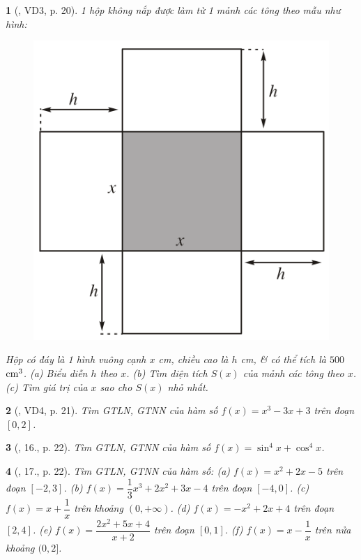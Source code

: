 \documentclass{article}
\newtheorem{baitoan}{}
\begin{document}
\begin{baitoan}[\cite{SGK_Toan_12_giai_tich_nang_cao}, VD3, p. 20]
	1 hộp không nắp được làm từ 1 mảnh các tông theo mẫu như hình:
	\begin{figure}[H]
		\centering
		\includegraphics[scale=.25]{hop_khong_nap}
	\end{figure}
	\noindent Hộp có đáy là 1 hình vuông cạnh $x$ {\rm cm}, chiều cao là $h$ {\rm cm}, \& có thể tích là $500$ $\rm cm^3$. (a) Biểu diễn $h$ theo $x$. (b) Tìm diện tích $S(x)$ của mảnh các tông theo $x$. (c) Tìm giá trị của $x$ sao cho $S(x)$ nhỏ nhất.
\end{baitoan}

\begin{baitoan}[\cite{SGK_Toan_12_giai_tich_nang_cao}, VD4, p. 21]
	Tìm {\rm GTLN, GTNN} của hàm số $f(x) = x^3 - 3x + 3$ trên đoạn $[0,2]$.
\end{baitoan}

\begin{baitoan}[\cite{SGK_Toan_12_giai_tich_nang_cao}, 16., p. 22]
	Tìm {\rm GTLN, GTNN} của hàm số $f(x) = \sin^4x + \cos^4x$.
\end{baitoan}

\begin{baitoan}[\cite{SGK_Toan_12_giai_tich_nang_cao}, 17., p. 22]
	Tìm {\rm GTLN, GTNN} của hàm số: (a) $f(x) = x^2 + 2x - 5$ trên đoạn $[-2,3]$. (b) $f(x) = \dfrac{1}{3}x^3 + 2x^2 + 3x - 4$ trên đoạn $[-4,0]$. (c) $f(x) = x + \dfrac{1}{x}$ trên khoảng $(0,+\infty)$. (d) $f(x) = -x^2 + 2x + 4$ trên đoạn $[2,4]$. (e) $f(x) = \dfrac{2x^2 + 5x + 4}{x + 2}$ trên đoạn $[0,1]$. (f) $f(x) = x - \dfrac{1}{x}$ trên nửa khoảng $(0,2]$.
\end{baitoan}
\end{document}
